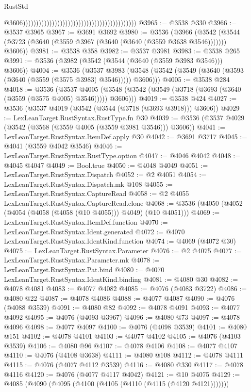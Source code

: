 \begin{lexlean}{RustStd}
\begin{coremodule}
                                                                                          @3606)))))))))))))))))))))))))))))))))))))))))))
@3965 := @3538 @330
@3966 := @3537 @3965
@3967 := @3691 @3692
@3980 := @3536
    (@3966 (@3542 (@3544 (@3723 (@3640 (@3559 @3967 (@3640 (@3640 (@3559 @3638 @3546))))))) @3606))
@3981 := @3538 @358
@3982 := @3537 @3981
@3983 := @3538 @265
@3991 := @3536 (@3982 (@3542 (@3544 (@3640 (@3559 @3983 @3546))) @3606))
@4004 := @3536
    (@3537 @3983 (@3548 (@3542 (@3549 (@3640 (@3593 (@3640 (@3559 (@3575 @3983) @3546))))) @3606)))
@4005 := @3538 @284
@4018 := @3536
    (@3537 @4005 (@3548 (@3542 (@3549 (@3718 (@3693 (@3640 (@3559 (@3575 @4005) @3546))))) @3606)))
@4019 := @3538 @424
@4027 := @3536 (@3537 @4019 (@3542 (@3544 (@3718 (@3693 @3918))) @3606))
@4029 := LexLeanTarget.RustSyntax.RustType.fn @30
@4039 := @3536 (@3537 @4029 (@3542 (@3568 (@3559 @4005 (@3559 @3981 @3546))) @3606))
@4041 := LexLeanTarget.RustSyntax.ItemDef.apply @30
@4042 := @3691 @3717
@4045 := @4041 (@3559 @4042 @3546)
@4046 := LexLeanTarget.RustSyntax.RustType.option
@4047 := @4046 @4042
@4048 := @4045 @4047
@4049 := Bool.true
@4050 := @4048 @4049
@4051 := LexLeanTarget.RustSyntax.Dispatch
@4052 := @2 @4051
@4054 := LexLeanTarget.RustSyntax.Dispatch.mk @108
@4055 := LexLeanTarget.RustSyntax.CaptureRead
@4058 := @2 @4055 LexLeanTarget.RustSyntax.CaptureRead.clone
@4068 := @3536 (@4050 (@4052 (@4054 (@4058 (@4058 (@10 @4055))) @4049) (@10 @4051)))
@4069 := LexLeanTarget.RustSyntax.ItemDef.function
@4070 := LexLeanTarget.RustSyntax.Ident.generated
@4072 := @4070 LexLeanTarget.RustSyntax.IdentKind.function
@4074 := @4069 (@4072 @30)
@4075 := LexLeanTarget.RustSyntax.Parameter
@4076 := @2 @4075
@4077 := LexLeanTarget.RustSyntax.Parameter.mk
@4078 := LexLeanTarget.RustSyntax.Pat.bind
@4080 := @4070 LexLeanTarget.RustSyntax.IdentKind.binding
@4081 := @4080 @30
@4082 := @4078 @4081
@4083 := @4077 @4082
@4085 := @4076 (@4083 @3722)
@4086 := @4080 @22
@4087 := @4078 @4086
@4088 := @4077 @4087
@4090 := @4076 (@4088 @3539)
@4091 := @4080 @82
@4092 := @4078 @4091
@4093 := @4077 @4092
@4095 := @4076 (@4093 @3967)
@4096 := @4080 @73
@4097 := @4078 @4096
@4098 := @4077 @4097
@4100 := @4076 (@4098 @3539)
@4101 := @4080 @151
@4102 := @4078 @4101
@4103 := @4077 @4102
@4105 := @4076 (@4103 @3539)
@4106 := @4080 @96
@4107 := @4078 @4106
@4108 := @4077 @4107
@4110 := @4076 (@4108 @3638)
@4111 := @4080 @108
@4112 := @4078 @4111
@4115 := @4076 (@4077 @4112 @3539)
@4116 := @4080 @330
@4117 := @4078 @4116
@4120 := @4076 (@4077 @4117 @4042)
@4121 := @10 @4075
@4129 := @4085 (@4090 (@4095 (@4100 (@4105 (@4110 (@4115 (@4120 @4121)))))))

\end{coremodule}
\end{lexlean}
